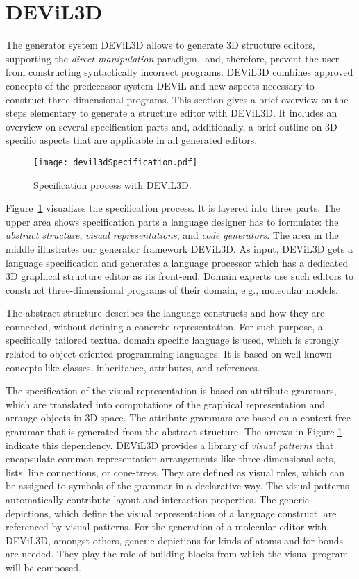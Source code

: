 \documentclass[a4paper]{article}
\newcommand{\dev}{DEViL3D\xspace}
\begin{document}
\section{\dev}
\label{sec:devil3d}
The generator system \dev \cite{Wol12} allows to generate 3D structure editors, supporting the \emph{direct manipulation} paradigm~\cite{Shn83} and, therefore, prevent the user from constructing syntactically incorrect programs. \dev combines approved concepts of the predecessor system DEViL \cite{SKC06, SCK07, SK03} and new aspects necessary to construct three-dimensional programs. This section gives a brief overview on the steps elementary to generate a structure editor with DEViL3D. It includes an overview on several specification parts and, additionally, a brief outline on 3D-specific aspects that are applicable in all generated editors.

\begin{figure}[!ht]
  \centering
  \texttt{[image: devil3dSpecification.pdf]}
  \caption{Specification process with \dev.}
  \label{fig:devil3dSpecification}
\end{figure}

Figure~\ref{fig:devil3dSpecification} visualizes the specification process. It is layered into three parts. The upper area shows specification parts a language designer has to formulate: the \emph{abstract structure}, \emph{visual representations}, and \emph{code generators}. The area in the middle illustrates our generator framework \dev. As input, \dev gets a language specification and generates a language processor which has a dedicated 3D graphical structure editor as its front-end. Domain experts use such editors to construct three-dimensional programs of their domain, e.g., molecular models.

The abstract structure describes the language constructs and how they are connected, without defining a concrete representation. For such purpose, a specifically tailored textual domain specific language is used, which is strongly related to object oriented programming languages. It is based on well known concepts like classes, inheritance, attributes, and references.

The specification of the visual representation is based on attribute grammars, which are translated into computations of the graphical representation and arrange objects in 3D space. The attribute grammars are based on a context-free grammar that is generated from the abstract structure. The arrows in Figure \ref{fig:devil3dSpecification} indicate this dependency. \dev provides a library of \emph{visual patterns} that encapsulate common representation arrangements like three-dimensional sets, lists, line connections, or cone-trees. They are defined as visual roles, which can be assigned to symbols of the grammar in a declarative way. The visual patterns automatically contribute layout and interaction properties. The generic depictions, which define the visual representation of a language construct, are referenced by visual patterns. For the generation of a molecular editor with \dev, amongst others, generic depictions for kinds of atoms and for bonds are needed. They play the role of building blocks from which the visual program will be composed.
\end{document}
